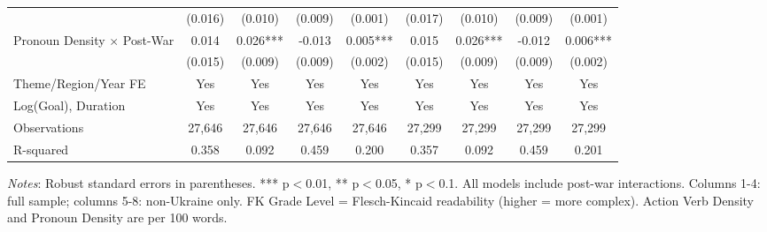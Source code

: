 \begin{table}[htbp]
\begin{threeparttable}
\begin{tabular}{lcccccccc}
& (0.016) & (0.010) & (0.009) & (0.001) & (0.017) & (0.010) & (0.009) & (0.001) \\
Pronoun Density $\times$ Post-War & 0.014 & 0.026*** & -0.013 & 0.005*** & 0.015 & 0.026*** & -0.012 & 0.006*** \\
& (0.015) & (0.009) & (0.009) & (0.002) & (0.015) & (0.009) & (0.009) & (0.002) \\
\midrule
Theme/Region/Year FE & Yes & Yes & Yes & Yes & Yes & Yes & Yes & Yes \\
Log(Goal), Duration & Yes & Yes & Yes & Yes & Yes & Yes & Yes & Yes \\
\midrule
Observations & 27,646 & 27,646 & 27,646 & 27,646 & 27,299 & 27,299 & 27,299 & 27,299 \\
R-squared & 0.358 & 0.092 & 0.459 & 0.200 & 0.357 & 0.092 & 0.459 & 0.201 \\
\bottomrule
\end{tabular}
\begin{tablenotes}
\small
\item \textit{Notes}: Robust standard errors in parentheses. *** p$<$0.01, ** p$<$0.05, * p$<$0.1. All models include post-war interactions. Columns 1-4: full sample; columns 5-8: non-Ukraine only. FK Grade Level = Flesch-Kincaid readability (higher = more complex). Action Verb Density and Pronoun Density are per 100 words.
\end{tablenotes}
\end{threeparttable}
\end{table}

